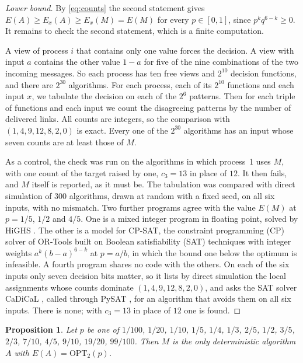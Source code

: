 \documentclass[11pt]{article}
\newtheorem{proposition}[theorem]{Proposition}
\theoremstyle{remark}
\newcommand{\OPT}{\mathrm{OPT}}
\begin{document}
\begin{proof}[Lower bound]
By \eqref{eq:counts} the second statement gives $E(A)\ge E_x(A)\ge E_x(M)=E(M)$ for every $p\in[0,1]$, since $p^kq^{6-k}\ge0$. It remains to check the second statement, which is a finite computation.

A view of process $i$ that contains only one value forces the decision. A view with input $a$ contains the other value $1-a$ for five of the nine combinations of the two incoming messages. So each process has ten free views and $2^{10}$ decision functions, and there are $2^{30}$ algorithms. For each process, each of its $2^{10}$ functions and each input $x$, we tabulate the decision on each of the $2^6$ patterns. Then for each triple of functions and each input we count the disagreeing patterns by the number of delivered links. All counts are integers, so the comparison with $(1,4,9,12,8,2,0)$ is exact. Every one of the $2^{30}$ algorithms has an input whose seven counts are at least those of $M$.

As a control, the check was run on the algorithms in which process~1 uses $M$, with one count of the target raised by one, $c_3=13$ in place of $12$. It then fails, and $M$ itself is reported, as it must be. The tabulation was compared with direct simulation of 300 algorithms, drawn at random with a fixed seed, on all six inputs, with no mismatch. Two further programs agree with the value $E(M)$ at $p=1/5$, $1/2$ and $4/5$. One is a mixed integer program in floating point, solved by HiGHS \cite{HiGHS}. The other is a model for CP-SAT, the constraint programming (CP) solver of OR-Tools built on Boolean satisfiability (SAT) techniques \cite{ORTools} with integer weights $a^k(b-a)^{6-k}$ at $p=a/b$, in which the bound one below the optimum is infeasible. A fourth program shares no code with the others. On each of the six inputs only seven decision bits matter, so it lists by direct simulation the local assignments whose counts dominate $(1,4,9,12,8,2,0)$, and asks the SAT solver CaDiCaL \cite{CaDiCaL}, called through PySAT \cite{PySAT}, for an algorithm that avoids them on all six inputs. There is none; with $c_3=13$ in place of $12$ one is found.
\end{proof}

\begin{proposition}\label{prop:unique}
Let $p$ be one of $1/100$, $1/20$, $1/10$, $1/5$, $1/4$, $1/3$, $2/5$, $1/2$, $3/5$, $2/3$, $7/10$, $4/5$, $9/10$, $19/20$, $99/100$. Then $M$ is the only deterministic algorithm $A$ with $E(A)=\OPT_2(p)$.
\end{proposition}
\end{document}
